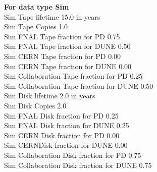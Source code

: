 \documentclass[12pt]{article}
\begin{document}
{\bf For data type Sim}\\
   Sim Tape lifetime  15.0 in years\\
   Sim Tape Copies   1.0\\
   Sim FNAL Tape fraction for PD  0.75\\
   Sim FNAL Tape fraction for DUNE  0.50\\
   Sim CERN Tape fraction for PD  0.00\\
   Sim CERN Tape fraction for DUNE  0.00\\
   Sim Collaboration Tape fraction for PD  0.25\\
   Sim Collaboration Tape fraction for DUNE  0.50\\
   Sim Disk lifetime   2.0 in years\\
   Sim Disk Copies   2.0\\
   Sim FNAL Disk fraction for PD  0.25\\
   Sim FNAL Disk fraction for DUNE  0.25\\
   Sim CERN Disk fraction for PD  0.00\\
   Sim CERNDisk fraction for DUNE  0.00\\
   Sim Collaboration Disk fraction for PD  0.75\\
   Sim Collaboration Disk fraction for DUNE  0.75\\
\end{document}
